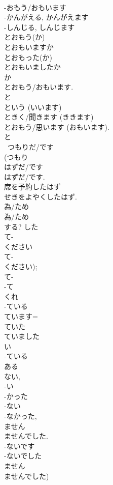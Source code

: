 \documentclass[8pt]{extreport}
\begin{document}
\begin{CJK}{UTF8}{min}
\\	-おもう/おもいます 
\\	-かんがえる, かんがえます 
\\	-しんじる, しんじます
\\	とおもう(か) 
\\	とおもいますか 
\\	とおもった(か) 
\\	とおもいましたか 
\\	か 
\\	とおもう/おもいます.	
\\	と 
\\	という (いいます) 
\\	ときく/聞きます (ききます) 
\\	とおもう/思います (おもいます).
\\	と 
\\	~つもりだ/です	
\\	(つもり 
\\	はずだ/です	
\\	はずだ/です. 
\\	席を予約したはず 
\\	せきをよやくしたはず. 
\\	為/ため		
\\	為/ため		
\\	する?	した	
\\	て-
\\	ください	
\\	て-
\\	ください); 
\\	て-
\\	-て 
\\	くれ	
\\	-ている 
\\	ています= 
\\	ていた 
\\	ていました 
\\	い 
\\	-ている 
\\	ある 
\\	ない, 
\\	-い 
\\	-かった	
\\	-ない 
\\	-なかった, 
\\	ません 
\\	ませんでした. 
\\	-ないです 
\\	-ないでした 
\\	ません 
\\	ませんでした)	

\end{CJK}
\end{document}
